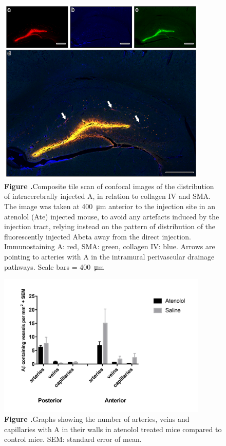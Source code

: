 \documentclass{frontiersFPHY} %
\newcommand{\Ab}{A\textbeta\xspace}
\begin{document}
\begin{figure}[h!]
\centering
\includegraphics[width=10cm]{figures/fig06.jpg}
\textbf{\label{fig:confocal} Figure .}{Composite tile scan of confocal images of the distribution of intracerebrally injected \Ab, in relation to collagen IV and SMA. The image was taken at \SI{400}{\micro\m} anterior to the injection site in an atenolol (Ate) injected mouse, to avoid any artefacts induced by the injection tract, relying instead on the pattern of distribution of the fluorescently injected Abeta away from the direct injection. Immunostaining \Ab: red, SMA: green, collagen IV: blue. Arrows are pointing to arteries with \Ab in the intramural perivascular drainage pathways. Scale bars = \SI{400}{\micro\m}}
\end{figure}

\begin{figure}[h!]
\centering
\includegraphics[width=10cm]{figures/fig07.jpg}
\textbf{\label{fig:graph} Figure .}{Graphs showing the number of arteries, veins and capillaries with \Ab in their walls in atenolol treated mice compared to control mice. SEM: standard error of mean.}
\end{figure}



\end{document}

